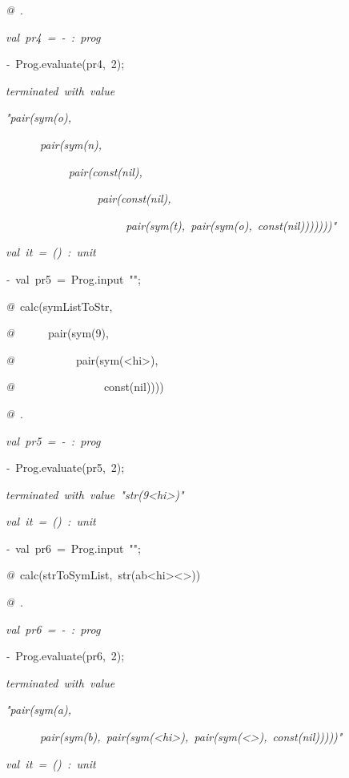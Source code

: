 \begin{list}{}
\item[]\textsl{@\ }.
\item[]\textsl{val\ pr4\ =\ -\ :\ prog}
\item[]\textsl{-\ }Prog.evaluate(pr4,\ 2);
\item[]\textsl{terminated\ with\ value}
\item[]\textsl{"pair(sym(o),}
\item[]\textsl{\ \ \ \ \ \ pair(sym(n),}
\item[]\textsl{\ \ \ \ \ \ \ \ \ \ \ pair(const(nil),}
\item[]\textsl{\ \ \ \ \ \ \ \ \ \ \ \ \ \ \ \ pair(const(nil),}
\item[]\textsl{\ \ \ \ \ \ \ \ \ \ \ \ \ \ \ \ \ \ \ \ \ pair(sym(t),\ pair(sym(o),\ const(nil)))))))"}
\item[]\textsl{val\ it\ =\ ()\ :\ unit}
\item[]\textsl{-\ }val\ pr5\ =\ Prog.input\ "";
\item[]\textsl{@\ }calc(symListToStr,
\item[]\textsl{@\ }\ \ \ \ \ pair(sym(9),
\item[]\textsl{@\ }\ \ \ \ \ \ \ \ \ \ pair(sym(<hi>),
\item[]\textsl{@\ }\ \ \ \ \ \ \ \ \ \ \ \ \ \ \ const(nil))))
\item[]\textsl{@\ }.
\item[]\textsl{val\ pr5\ =\ -\ :\ prog}
\item[]\textsl{-\ }Prog.evaluate(pr5,\ 2);
\item[]\textsl{terminated\ with\ value\ "str(9<hi>)"}
\item[]\textsl{val\ it\ =\ ()\ :\ unit}
\item[]\textsl{-\ }val\ pr6\ =\ Prog.input\ "";
\item[]\textsl{@\ }calc(strToSymList,\ str(ab<hi><>))
\item[]\textsl{@\ }.
\item[]\textsl{val\ pr6\ =\ -\ :\ prog}
\item[]\textsl{-\ }Prog.evaluate(pr6,\ 2);
\item[]\textsl{terminated\ with\ value}
\item[]\textsl{"pair(sym(a),}
\item[]\textsl{\ \ \ \ \ \ pair(sym(b),\ pair(sym(<hi>),\ pair(sym(<>),\ const(nil)))))"}
\item[]\textsl{val\ it\ =\ ()\ :\ unit}
\end{list}
